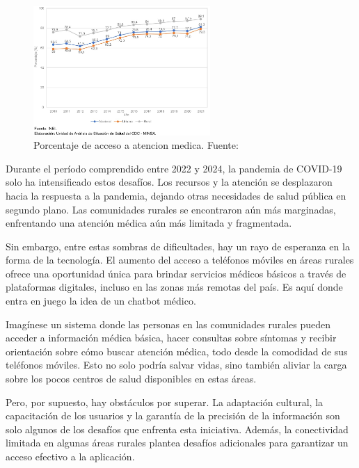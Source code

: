 \begin{figure}[h]
	\begin{center}
		\includegraphics[width=0.6\textwidth]{1/figures/MINSA.jpeg}
		\caption{Porcentaje de acceso a atencion medica. Fuente: \cite{gl_inei}}
		\label{2:fig}
	\end{center}
\end{figure}

Durante el período comprendido entre 2022 y 2024, la pandemia de COVID-19 solo ha intensificado estos desafíos. Los recursos y la atención se desplazaron hacia la respuesta a la pandemia, dejando otras necesidades de salud pública en segundo plano. Las comunidades rurales se encontraron aún más marginadas, enfrentando una atención médica aún más limitada y fragmentada.

Sin embargo, entre estas sombras de dificultades, hay un rayo de esperanza en la forma de la tecnología. El aumento del acceso a teléfonos móviles en áreas rurales ofrece una oportunidad única para brindar servicios médicos básicos a través de plataformas digitales, incluso en las zonas más remotas del país. Es aquí donde entra en juego la idea de un chatbot médico.

Imagínese un sistema donde las personas en las comunidades rurales pueden acceder a información médica básica, hacer consultas sobre síntomas y recibir orientación sobre cómo buscar atención médica, todo desde la comodidad de sus teléfonos móviles. Esto no solo podría salvar vidas, sino también aliviar la carga sobre los pocos centros de salud disponibles en estas áreas.

Pero, por supuesto, hay obstáculos por superar. La adaptación cultural, la capacitación de los usuarios y la garantía de la precisión de la información son solo algunos de los desafíos que enfrenta esta iniciativa. Además, la conectividad limitada en algunas áreas rurales plantea desafíos adicionales para garantizar un acceso efectivo a la aplicación.

